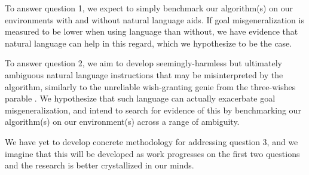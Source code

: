 \documentclass[../thesis-proposal/main.tex]{subfiles}
\begin{document}
To answer question 1, we expect to simply benchmark our algorithm(s) on our environments with and
without natural language aids. If goal misgeneralization is measured to be lower when using language
than without, we have evidence that natural language can help in this regard, which we hypothesize
to be the case.

To answer question 2, we aim to develop seemingly-harmless but ultimately ambiguous natural language
instructions that may be misinterpreted by the algorithm, similarly to the unreliable wish-granting
genie from the three-wishes parable \citep{perrault_les_1865, galland_les_1717}. We hypothesize that
such language can actually exacerbate goal misgeneralization, and intend to search for evidence of
this by benchmarking our algorithm(s) on our environment(s) across a range of ambiguity.

We have yet to develop concrete methodology for addressing question 3, and we imagine that this will
be developed as work progresses on the first two questions and the research is better crystallized 
in our minds.


\ifSubfilesClassLoaded{%
  
}{}
\end{document}

